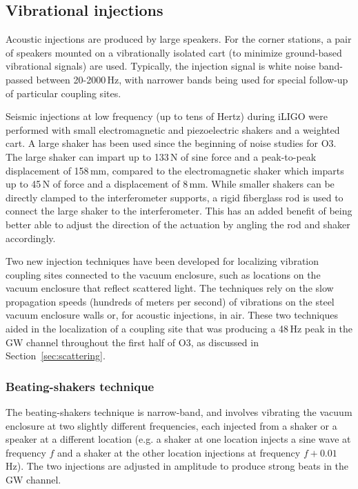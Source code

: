 \subsection{Vibrational injections}

Acoustic injections are produced by large speakers. For the corner stations, a pair of speakers mounted on a vibrationally isolated cart (to minimize ground-based vibrational signals) are used.
Typically, the injection signal is white noise band-passed between 20-2000\,Hz, with narrower bands being used for special follow-up of particular coupling sites.

Seismic injections at low frequency (up to tens of Hertz) during \ac{iLIGO} were performed with small electromagnetic and piezoelectric shakers and a weighted cart.%
A large shaker has been used since the beginning of noise studies for \ac{O3}.
The large shaker can impart up to 133\,N of sine force and a peak-to-peak displacement of 158\,mm, compared to the electromagnetic shaker which imparts up to 45\,N of force and a displacement of 8\,mm.
While smaller shakers can be directly clamped to the interferometer supports, a rigid fiberglass rod is used to connect the large shaker to the interferometer.
This has an added benefit of being better able to adjust the direction of the actuation by angling the rod and shaker accordingly.

Two new injection techniques have been developed for localizing vibration coupling sites connected to the vacuum enclosure, such as locations on the vacuum enclosure that reflect scattered light.
The techniques rely on the slow propagation speeds (hundreds of meters per second) of vibrations on the steel vacuum enclosure walls or, for acoustic injections, in air.
These two techniques aided in the localization of a coupling site that was producing a 48\,Hz peak in the \ac{GW} channel throughout the first half of O3, as discussed in Section~\ref{sec:scattering}.

\subsubsection{Beating-shakers technique}

The beating-shakers technique is narrow-band, and involves vibrating the vacuum enclosure at two slightly different frequencies, each injected from a shaker or a speaker at a different location (e.g. a shaker at one location injects a sine wave at frequency $f$ and a shaker at the other location injections at frequency $f + 0.01$\,Hz).
The two injections are adjusted in amplitude to produce strong beats in the \ac{GW} channel.

